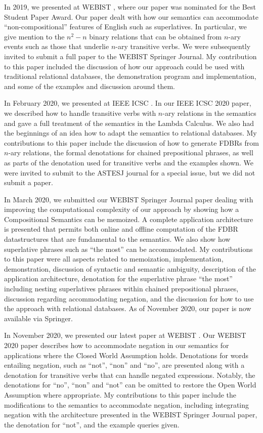 \documentclass[../main.tex]{subfiles}
\begin{document}
\begin{refsection}
    In 2019, we presented at WEBIST \cite{frostpeelar2019}, where our paper was nominated for the Best Student Paper Award.  Our paper dealt with how our semantics can accommodate ``non-compositional'' features of English such as superlatives.  In particular, we give mention to the $n^2 - n$ binary relations that can be obtained from $n$-ary events such as those that underlie $n$-ary transitive verbs.  We were subsequently invited to submit a full paper to the WEBIST Springer Journal.
    My contribution to this paper included the discussion of how our approach could be used with traditional relational databases, the demonstration program and implementation, and some of the examples and discussion around them.

    In February 2020, we presented at IEEE ICSC \cite{peelar2020compositional}.  In our IEEE ICSC 2020 paper, we described how to handle transitive verbs with $n$-ary relations in the semantics and gave a full treatment of the semantics in the Lambda Calculus.  We also had the beginnings of an idea how to adapt the semantics to relational databases.  My contributions to this paper include the discussion of how to generate FDBRs from $n$-ary relations, the formal denotations for chained prepositional phrases, as well as parts of the denotation used for transitive verbs and the examples shown. We were invited to submit to the ASTESJ journal for a special issue, but we did not submit a paper.

    In March 2020, we submitted our WEBIST Springer Journal \cite{peelar2020webistjournal} paper dealing with improving the computational complexity of our approach by showing how a Compositional Semantics can be memoized.  A complete application architecture is presented that permits both online and offline computation of the FDBR datastructures that are fundamental to the semantics.  We also show how superlative phrases such as ``the most'' can be accommodated.  My contributions to this paper were all aspects related to memoization, implementation, demonstration, discussion of syntactic and semantic ambiguity, description of the application architecture, denotation for the superlative phrase ``the most'' including nesting superlatives phrases within chained prepositional phrases, discussion regarding accommodating negation, and the discussion for how to use the approach with relational databases.  As of November 2020, our paper is now available via Springer.

    In November 2020, we presented our latest paper at WEBIST \cite{peelarfrostwebist2020}.  Our WEBIST 2020 paper describes how to accommodate negation in our semantics for applications where the Closed World Assumption holds.  Denotations for words entailing negation, such as ``not'', ``non'' and ``no'', are presented along with a denotation for transitive verbs that can handle negated expressions.  Notably, the denotations for ``no'', ``non'' and ``not'' can be omitted to restore the Open World Assumption where appropriate.
    My contributions to this paper include the modifications to the semantics to accommodate negation, including integrating negation with the architecture presented in the WEBIST Springer Journal paper, the denotation for ``not'', and the example queries given.


\end{refsection}
\end{document}

